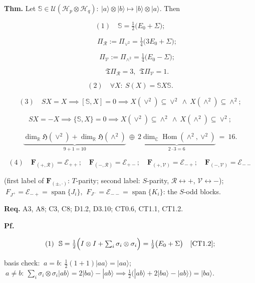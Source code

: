 \begin{theorem}\label{tag:CT0-7}
\textbf{Thm.} Let $\mathbb S\in\mathcal U(\mathcal H_p\otimes\mathcal H_q):\ |a\rangle\otimes|b\rangle\mapsto|b\rangle\otimes|a\rangle$. Then

\[
(1)\quad \mathbb S=\tfrac12\bigl(E_0+\Sigma\bigr);
\]

\[
\qquad \Pi_{\mathcal R}:=\Pi_{\vee^2}=\tfrac14\bigl(3E_0+\Sigma\bigr);
\]

\[
\qquad \Pi_{\mathcal V}:=\Pi_{\wedge^2}=\tfrac14\bigl(E_0-\Sigma\bigr);
\]

\[
\qquad \mathfrak T\Pi_{\mathcal R}=3,\ \ \mathfrak T\Pi_{\mathcal V}=1 .
\]

\[
(2)\quad \forall X:\ S(X)=\mathbb S X\mathbb S .
\]

\[
(3)\quad SX=X\implies[\mathbb S,X]=0\implies X(\vee^2)\subseteq\vee^2\ \wedge\ X(\wedge^2)\subseteq\wedge^2;
\]

\[
SX=-X\implies\{\mathbb S,X\}=0\implies X(\vee^2)\subseteq\wedge^2\ \wedge\ X(\wedge^2)\subseteq\vee^2;
\]

\[
\underbrace{\dim_{\mathbb R}\mathfrak H(\vee^2)+\dim_{\mathbb R}\mathfrak H(\wedge^2)}_{9+1=10}\ \oplus\ \underbrace{2\dim_{\mathbb C}\operatorname{Hom}(\wedge^2,\vee^2)}_{2\cdot3=6}\ =\ 16 .
\]

\[
(4)\quad \mathbf F_{(+,\mathcal R)}=\mathcal E_{++};\quad
\mathbf F_{(-,\mathcal R)}=\mathcal E_{+-};\quad
\mathbf F_{(+,\mathcal V)}=\mathcal E_{-+};\quad
\mathbf F_{(-,\mathcal V)}=\mathcal E_{--}
\]

(first label of $\mathbf F_{(\pm,\cdot)}$: $T$-parity; second label: $S$-parity, $\mathcal R\leftrightarrow+$, $\mathcal V\leftrightarrow-$); $\ F_{J^+}=\mathcal E_{-+}=\operatorname{span}\{J_i\}$, $\ F_{J^-}=\mathcal E_{--}=\operatorname{span}\{K_i\}$: the $S$-odd blocks.

\textbf{Req.} A3, A8; C3, C8; D1.2, D3.10; CT0.6, CT1.1, CT1.2.

\textbf{Pf.}

\[
(1)\ \ \mathbb S=\tfrac12\Bigl(I\otimes I+\textstyle\sum_i\sigma_i\otimes\sigma_i\Bigr)=\tfrac12\bigl(E_0+\Sigma\bigr)\quad[\mathrm{CT1.2}];
\]

basis check: $\ a=b:\ \tfrac12(1+1)|aa\rangle=|aa\rangle$; $\ a\ne b:\ \sum_i\sigma_i\otimes\sigma_i|ab\rangle=2|ba\rangle-|ab\rangle\implies\tfrac12(|ab\rangle+2|ba\rangle-|ab\rangle)=|ba\rangle$.


\end{theorem}
